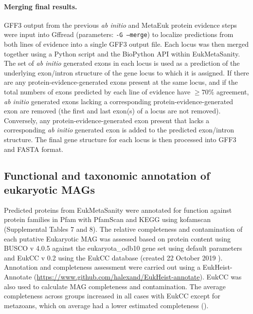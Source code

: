 \documentclass[12pt]{article}
\numberwithin{equation}{section}
\begin{document}
\paragraph{Merging final results.} GFF3 output from the previous \textit{ab initio} and MetaEuk protein evidence steps were input into Gffread \citep{Pertea2020} (parameters: \texttt{-G --merge}) to localize predictions from both lines of evidence into a single GFF3 output file.  Each locus was then merged together using a Python \citep{Python} script and the BioPython API \citep{BioPython} within EukMetaSanity. The set of \textit{ab initio} generated exons in each locus is used as a prediction of the underlying exon/intron structure of the gene locus to which it is assigned. If there are any protein-evidence-generated exons present at the same locus, and if the total numbers of exons predicted by each line of evidence have $\geq 70\%$ agreement, \textit{ab initio} generated exons lacking a corresponding protein-evidence-generated exon are removed (the first and last exon(s) of a locus are not removed). Conversely, any protein-evidence-generated exon present that lacks a corresponding \textit{ab initio} generated exon is added to the predicted exon/intron structure. The final gene structure for each locus is then processed into GFF3 and FASTA format.

\subsection*{Functional and taxonomic annotation of eukaryotic MAGs} 

Predicted proteins from EukMetaSanity were annotated for function against protein families in Pfam with PfamScan \citep{Finn2014Pfam} and KEGG using kofamscan \citep{Kanehisa_2019, Aramaki_2019} (Supplemental Tables 7 and 8). The relative completeness and contamination  of each putative Eukaryotic MAG was assessed based on protein content using BUSCO v 4.0.5 against the eukaryota\_odb10 gene set using default parameters \citep{Simao2015BUSCO} and EukCC v 0.2 using the EukCC database (created 22 October 2019 \citep{Saary2020Estimating}). Annotation and completeness assessment were carried out using a EukHeist-Annotate (\url{https://www.github.com/halexand/EukHeist-annotate}). EukCC \citep{Saary2020Estimating} was also used to calculate MAG completeness and contamination. The average completeness across groups increased in all cases with EukCC except for metazoans, which on average had a lower estimated completeness (). 
\end{document}
